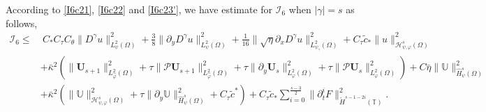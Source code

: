\documentclass{amsart}
\numberwithin{equation}{section}
\begin{document}
According to \eqref{I6c21}, \eqref{I6c22} and \eqref{I6c23'}, we have estimate for $\mathcal{I}_{6}$ when $|\gamma|=s$ as follows,
\begin{align*}
\mathcal{I}_{6}
\leq&~C_{*}C_{\tau}C_{\theta}\|D^{\gamma}u\|_{L_{\psi}^{2}(\Omega)}^{2}
     +\frac{3}{8}\|\partial_{y}D^{\gamma}u\|_{L_{\psi}^{2}(\Omega)}^{2}
     +\frac{1}{16}\|\sqrt{\eta}\partial_{x}D^{\gamma}u\|_{L_{\psi_{\gamma}}^{2}(\Omega)}^{2}
     +C_{\tau}\tilde{c}_{*}\|u\|_{\mathcal{H}_{\psi,\varphi}^{s}(\Omega)}^{2}\\
    &+\bar{\kappa}^{2}\left(\|\mathbf{U}_{s+1}\|_{L_{\hat{\varphi}}^{2}(\Omega)}^{2}
                +\tau\|\mathcal{P}\mathbf{U}_{s+1}\|_{L_{\hat{\varphi}}^{2}(\Omega)}^{2}
                +\tau\|\partial_{y}\mathbf{U}_{s}\|_{L_{\varphi}^{2}(\Omega)}^{2}
                +\tau\|\mathcal{P}\mathbf{U}_{s}\|_{L_{\varphi}^{2}(\Omega)}^{2}\right)
     +C\bar{\eta}\|\mathbb{U}\|_{\hat{H}_{\psi}^{s}(\Omega)}^{2}\\
    &+\bar{\kappa}^{2}\left(\|\mathbb{U}\|_{\mathcal{H}_{\psi,\varphi}^{s}(\Omega)}^{2}
                +\tau\|\partial_{y}\mathbb{U}\|_{\hat{H}_{\psi}^{s}(\Omega)}^{2}
                +C_{\tau}\tilde{c}^{*}\right)
     +C_{\tau}\tilde{c}_{*}\sum_{i=0}^{\frac{s-3}{2}}\|\partial_{t}^{i}F\|_{\mathring{H}^{s-1-2i}(\mathbb{T})}^{2}.
\end{align*}
\end{document}
